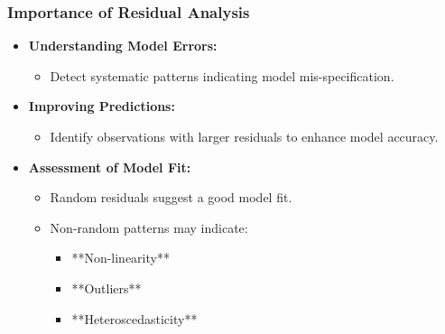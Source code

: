 \documentclass[aspectratio=169]{beamer}
\begin{document}
\begin{frame}[fragile]
    \frametitle{Importance of Residual Analysis}
    \begin{itemize}
        \item \textbf{Understanding Model Errors:}
        \begin{itemize}
            \item Detect systematic patterns indicating model mis-specification.
        \end{itemize}
        
        \item \textbf{Improving Predictions:}
        \begin{itemize}
            \item Identify observations with larger residuals to enhance model accuracy.
        \end{itemize}
        
        \item \textbf{Assessment of Model Fit:}
        \begin{itemize}
            \item Random residuals suggest a good model fit.
            \item Non-random patterns may indicate:
            \begin{itemize}
                \item **Non-linearity**
                \item **Outliers**
                \item **Heteroscedasticity**
            \end{itemize}
        \end{itemize}
    \end{itemize}
\end{frame}
\end{document}
